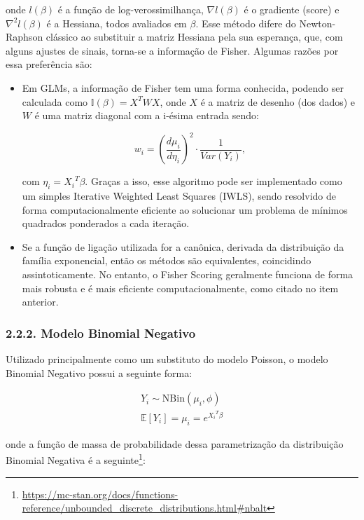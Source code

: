 \documentclass[
]{article}
\begin{document}
onde \(l(\beta)\) é a função de log-verossimilhança, \(\nabla l(\beta)\)
é o gradiente (score) e \(\nabla^2 l(\beta)\) é a Hessiana, todos
avaliados em \(\beta\). Esse método difere do Newton-Raphson clássico ao
substituir a matriz Hessiana pela sua esperança, que, com alguns ajustes
de sinais, torna-se a informação de Fisher. Algumas razões por essa
preferência são:

\begin{itemize}
\item
  Em GLMs, a informação de Fisher tem uma forma conhecida, podendo ser
  calculada como \(\mathbb{I}(\beta) = X^TWX\), onde \(X\) é a matriz de
  desenho (dos dados) e \(W\) é uma matriz diagonal com a i-ésima
  entrada sendo:

  \[
  w_i = \left(\dfrac{d\mu_i}{d\eta_i}\right)^2 \cdot \dfrac{1}{Var(Y_i)},
  \]

  com \(\eta_i = {X_i}^T\beta\). Graças a isso, esse algoritmo pode ser
  implementado como um simples Iterative Weighted Least Squares (IWLS),
  sendo resolvido de forma computacionalmente eficiente ao solucionar um
  problema de mínimos quadrados ponderados a cada iteração.
\item
  Se a função de ligação utilizada for a canônica, derivada da
  distribuição da família exponencial, então os métodos são
  equivalentes, coincidindo assintoticamente. No entanto, o Fisher
  Scoring geralmente funciona de forma mais robusta e é mais eficiente
  computacionalmente, como citado no item anterior.
\end{itemize}

\subsubsection{2.2.2. Modelo Binomial
Negativo}\label{modelo-binomial-negativo}

Utilizado principalmente como um substituto do modelo Poisson, o modelo
Binomial Negativo possui a seguinte forma:

\[
\begin{array}{c}
Y_i \sim \text{NBin}(\mu_i, \phi) \\
\mathbb{E}[Y_i] = \mu_i = e^{{X_i}^T\beta}
\end{array}
\]

onde a função de massa de probabilidade dessa parametrização da
distribuição Binomial Negativa é a seguinte\footnote{\url{https://mc-stan.org/docs/functions-reference/unbounded_discrete_distributions.html\#nbalt}}:
\end{document}
